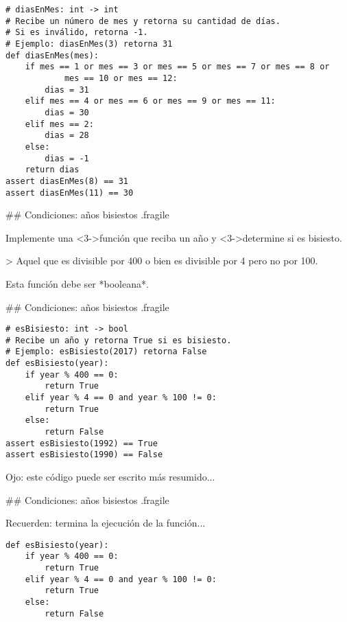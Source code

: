 \begin{lstlisting}[style=frame02]
# diasEnMes: int -> int
# Recibe un número de mes y retorna su cantidad de días.
# Si es inválido, retorna -1.
# Ejemplo: diasEnMes(3) retorna 31
def diasEnMes(mes):
    if mes == 1 or mes == 3 or mes == 5 or mes == 7 or mes == 8 or
            mes == 10 or mes == 12:
        dias = 31
    elif mes == 4 or mes == 6 or mes == 9 or mes == 11:
        dias = 30
    elif mes == 2:
        dias = 28
    else:
        dias = -1
    return dias
assert diasEnMes(8) == 31
assert diasEnMes(11) == 30
\end{lstlisting}

## Condiciones: años bisiestos {.fragile}

\bgnblockgood
Implemente una \alert{<3->}{función que} reciba un año y \alert{<3->}{determine si} es bisiesto.
\trmblockgood

\pause

\vfill


> Aquel que es divisible por 400 o bien es divisible por 4 pero no por 100.

\pause

\vfill

\bgnblockidea
Esta función debe ser *booleana*.
\trmblockidea

## Condiciones: años bisiestos {.fragile}

\begin{lstlisting}[style=frame02]
# esBisiesto: int -> bool
# Recibe un año y retorna True si es bisiesto.
# Ejemplo: esBisiesto(2017) retorna False
def esBisiesto(year):
    if year % 400 == 0:
        return True
    elif year % 4 == 0 and year % 100 != 0:
        return True
    else:
        return False
assert esBisiesto(1992) == True
assert esBisiesto(1990) == False
\end{lstlisting}

\bgnblockalert
Ojo: este código puede ser escrito más resumido...
\trmblockalert

## Condiciones: años bisiestos {.fragile}

\bgnblockidea
Recuerden:  termina la ejecución de la función...
\trmblockidea

\vspace{-2ex}
\bgncolumns
{}

\begin{lstlisting}[style=frame02]
def esBisiesto(year):
    if year % 400 == 0:
        return True
    elif year % 4 == 0 and year % 100 != 0:
        return True
    else:
        return False
\end{lstlisting}


